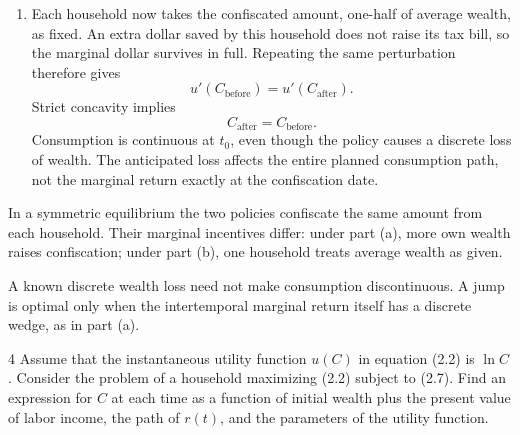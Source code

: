 \begin{solution}
\begin{enumerate}[label=(\alph*)]
    \item Each household now takes the confiscated amount, one-half of
    average wealth, as fixed. An extra dollar saved by this household does
    not raise its tax bill, so the marginal dollar survives in full. Repeating
    the same perturbation therefore gives
    \[
        u'(C_{\mathrm{before}})=u'(C_{\mathrm{after}}).
    \]
    Strict concavity implies
    \[
        \boxed{C_{\mathrm{after}}=C_{\mathrm{before}}.}
    \]
    Consumption is continuous at \(t_0\), even though the policy causes a
    discrete loss of wealth. The anticipated loss affects the entire planned
    consumption path, not the marginal return exactly at the confiscation
    date.
\end{enumerate}
\end{solution}

\begin{note}
    In a symmetric equilibrium the two policies confiscate the same amount
    from each household. Their marginal incentives differ: under part (a),
    more own wealth raises confiscation; under part (b), one household treats
    average wealth as given.
\end{note}

\begin{note}
    A known discrete wealth loss need not make consumption discontinuous.
    A jump is optimal only when the intertemporal marginal return itself has
    a discrete wedge, as in part (a).
\end{note}

\begin{problem}{4}
Assume that the instantaneous utility function \(u\left(C\right)\) in equation (2.2) is \(\ln C\). Consider the problem of a household maximizing (2.2) subject to (2.7). Find an expression for \(C\) at each time as a function of initial wealth plus the present value of labor income, the path of \(r\left(t\right)\), and the parameters of the utility function.
\end{problem}

